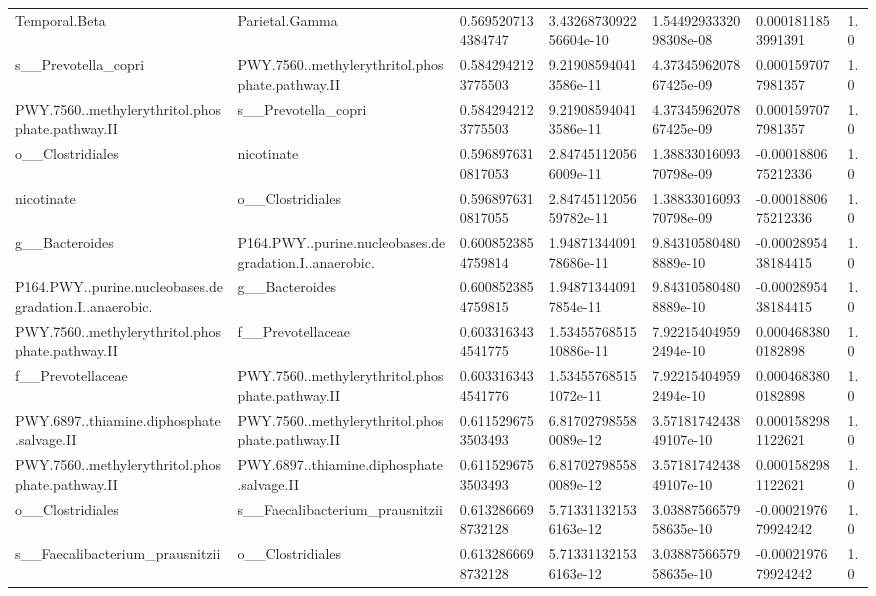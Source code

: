 \begin{longtable}{lllllll}
Temporal.Beta & Parietal.Gamma & 0.5695207134384747 & 3.4326873092256604e-10 & 1.5449293332098308e-08 & 0.0001811853991391 & 1.0 \\
s\_\_Prevotella\_copri & PWY.7560..methylerythritol.phosphate.pathway.II & 0.5842942123775503 & 9.219085940413586e-11 & 4.3734596207867425e-09 & 0.0001597077981357 & 1.0 \\
PWY.7560..methylerythritol.phosphate.pathway.II & s\_\_Prevotella\_copri & 0.5842942123775503 & 9.219085940413586e-11 & 4.3734596207867425e-09 & 0.0001597077981357 & 1.0 \\
o\_\_Clostridiales & nicotinate & 0.5968976310817053 & 2.847451120566009e-11 & 1.3883301609370798e-09 & -0.0001880675212336 & 1.0 \\
nicotinate & o\_\_Clostridiales & 0.5968976310817055 & 2.8474511205659782e-11 & 1.3883301609370798e-09 & -0.0001880675212336 & 1.0 \\
g\_\_Bacteroides & P164.PWY..purine.nucleobases.degradation.I..anaerobic. & 0.6008523854759814 & 1.9487134409178686e-11 & 9.843105804808889e-10 & -0.0002895438184415 & 1.0 \\
P164.PWY..purine.nucleobases.degradation.I..anaerobic. & g\_\_Bacteroides & 0.6008523854759815 & 1.948713440917854e-11 & 9.843105804808889e-10 & -0.0002895438184415 & 1.0 \\
PWY.7560..methylerythritol.phosphate.pathway.II & f\_\_Prevotellaceae & 0.6033163434541775 & 1.5345576851510886e-11 & 7.922154049592494e-10 & 0.0004683800182898 & 1.0 \\
f\_\_Prevotellaceae & PWY.7560..methylerythritol.phosphate.pathway.II & 0.6033163434541776 & 1.534557685151072e-11 & 7.922154049592494e-10 & 0.0004683800182898 & 1.0 \\
PWY.6897..thiamine.diphosphate.salvage.II & PWY.7560..methylerythritol.phosphate.pathway.II & 0.6115296753503493 & 6.817027985580089e-12 & 3.5718174243849107e-10 & 0.0001582981122621 & 1.0 \\
PWY.7560..methylerythritol.phosphate.pathway.II & PWY.6897..thiamine.diphosphate.salvage.II & 0.6115296753503493 & 6.817027985580089e-12 & 3.5718174243849107e-10 & 0.0001582981122621 & 1.0 \\
o\_\_Clostridiales & s\_\_Faecalibacterium\_prausnitzii & 0.6132866698732128 & 5.713311321536163e-12 & 3.0388756657958635e-10 & -0.0002197679924242 & 1.0 \\
s\_\_Faecalibacterium\_prausnitzii & o\_\_Clostridiales & 0.6132866698732128 & 5.713311321536163e-12 & 3.0388756657958635e-10 & -0.0002197679924242 & 1.0 \\

\end{longtable}
